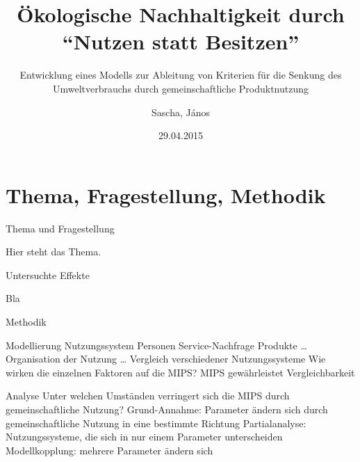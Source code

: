 \documentclass[beamer]{beamer}
\title{Ökologische Nachhaltigkeit durch \\ \enquote{Nutzen statt Besitzen}}
\subtitle{{\small Entwicklung eines Modells zur Ableitung von Kriterien für die Senkung des Umweltverbrauchs durch gemeinschaftliche Produktnutzung}}
\author{Sascha, János}
\date{29.04.2015}
\begin{document}
\frame{\titlepage}


\section{Thema, Fragestellung, Methodik}

	\begin{frame}{Thema und Fragestellung}
	  \begin{center}
	  	Hier steht das Thema.
	  \end{center}
	\end{frame}
	
	\begin{frame}{Untersuchte Effekte}
		\begin{center}
			Bla
		\end{center}
	\end{frame}
	
	\begin{frame}{Methodik}
		\begin{center}
			Modellierung
				Nutzungssystem
					Personen
					Service-Nachfrage
					Produkte
						…
					Organisation der Nutzung
						…
				Vergleich verschiedener Nutzungssysteme
					Wie wirken die einzelnen Faktoren auf die MIPS?
					MIPS gewährleistet Vergleichbarkeit
			
			Analyse
				Unter welchen Umständen verringert sich die MIPS durch gemeinschaftliche Nutzung?
				Grund-Annahme: Parameter ändern sich durch gemeinschaftliche Nutzung in eine bestimmte Richtung
				Partialanalyse: Nutzungssysteme, die sich in nur einem Parameter unterscheiden
				Modellkopplung: mehrere Parameter ändern sich	
		\end{center}
	\end{frame}
\end{document}
